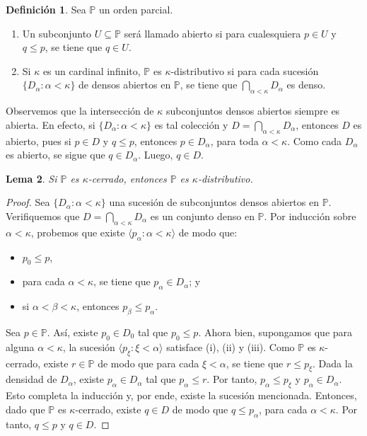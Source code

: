 \documentclass[11pt]{unam_tesis1}
\theoremstyle{MyThmStyle}
\theoremstyle{definition}
\newtheorem{definition}{Definici\'on}[chapter]
\theoremstyle{plain}
\newtheorem{lemma}[definition]{Lema}
\theoremstyle{remark}
\let\leq\leqslant
\begin{document}
\begin{definition}
Sea $\mathbb P$ un orden parcial.
\begin{enumerate}
\item Un subconjunto $U\subseteq \mathbb P$ ser\'a llamado abierto si para cualesquiera $p\in U$ y $q\leq p$, se tiene que $q\in U$.
\item Si $\kappa$ es un cardinal infinito, $\mathbb P$ es $\kappa$-distributivo si para cada sucesi\'on $\{D_\alpha:\alpha<\kappa \}$ de densos abiertos en $\mathbb P$, se tiene que $\bigcap_{\alpha<\kappa}D_\alpha$ es denso.
\end{enumerate}
\end{definition}

Observemos que la intersecci\'on de $\kappa$ subconjuntos densos abiertos siempre es abierta. En efecto, si $\{D_\alpha:\alpha<\kappa \}$ es tal colecci\'on y $D=\bigcap_{\alpha<\kappa}D_\alpha$, entonces $D$ es abierto, pues si $p\in D$ y $q\leq p$, entonces $p\in D_\alpha$, para toda $\alpha<\kappa$. Como cada $D_\alpha$ es abierto, se sigue que $q\in D_\alpha$. Luego, $q\in D$.

\begin{lemma}
Si $\mathbb P$ es $\kappa$-cerrado, entonces $\mathbb P$ es $\kappa$-distributivo.
\end{lemma}

\begin{proof}
Sea $\{D_\alpha:\alpha<\kappa\}$ una sucesi\'on de subconjuntos densos abiertos en $\mathbb P$. Verifiquemos que $D=\bigcap_{\alpha<\kappa}D_\alpha$ es un conjunto denso en $\mathbb P$. Por inducci\'on sobre $\alpha<\kappa$, probemos que existe $\langle p_\alpha:\alpha<\kappa \rangle$ de modo que:

\begin{itemize}
\item [(i)] $p_0\leq p$,
\item [(ii)]para cada $\alpha<\kappa$, se tiene que $p_\alpha\in D_\alpha$; y
\item [(iii)] si $\alpha<\beta<\kappa$, entonces $p_\beta\leq p_\alpha$.
\end{itemize}

Sea $p\in \mathbb P$. As\'i, existe $p_0\in D_0$ tal que $p_0\leq p$. Ahora bien, supongamos que para alguna $\alpha<\kappa$, la sucesi\'on $\langle p_\xi: \xi<\alpha \rangle$ satisface (i), (ii) y (iii). Como $\mathbb P$ es $\kappa$-cerrado, existe $r\in \mathbb P$ de modo que para cada $\xi<\alpha$, se tiene que $r\leq p_\xi$. Dada la densidad de $D_\alpha$, existe $p_\alpha\in D_\alpha$ tal que $p_\alpha\leq r$. Por tanto, $p_\alpha\leq p_\xi$ y $p_\alpha\in D_\alpha$. Esto completa la inducci\'on y, por ende, existe la sucesi\'on mencionada. Entonces, dado que $\mathbb P$ es $\kappa$-cerrado, existe $q\in D$ de modo que $q\leq p_\alpha$, para cada $\alpha<\kappa$. Por tanto, $q\leq p$ y $q\in D$.
\end{proof}
\end{document}
